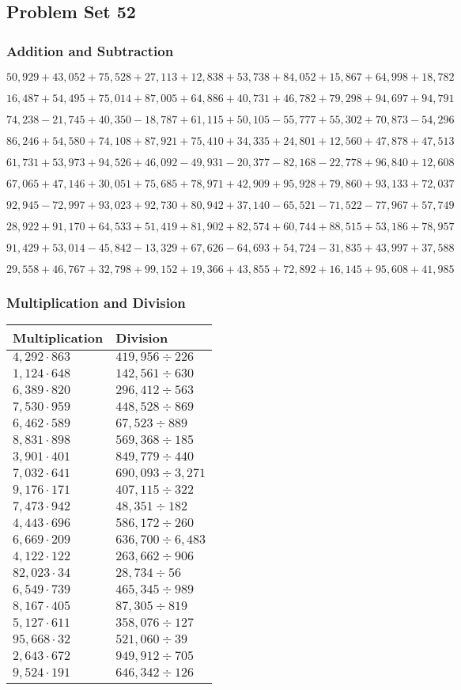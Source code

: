 \hypertarget{problem-set-52-3}{%
\subsection{Problem Set 52}\label{problem-set-52-3}}

\hypertarget{addition-and-subtraction-274}{%
\subsubsection{Addition and
Subtraction}\label{addition-and-subtraction-274}}

\(50,929+43,052+75,528+27,113+12,838+53,738+84,052+15,867+64,998+ 18,782\)

\(16,487+54,495+75,014+87,005+64,886+40,731+46,782+79,298+94,697+94,791\)

\(74,238-21,745+40,350-18,787+61,115+50,105-55,777+55,302+70,873-54,296\)

\(86,246+54,580+74,108+87,921+75,410+34,335+24,801+12,560+47,878+47,513\)

\(61,731+53,973+94,526+46,092-49,931-20,377-82,168-22,778+96,840+12,608\)

\(67,065+47,146+30,051+75,685+78,971+42,909+95,928+79,860+93,133+72,037\)

\(92,945-72,997+93,023+92,730+80,942+37,140-65,521-71,522-77,967+57,749\)

\(28,922+91,170+64,533+51,419+81,902+82,574+60,744+88,515+53,186+78,957\)

\(91,429+53,014-45,842-13,329+67,626-64,693+54,724-31,835+43,997+37,588\)

\(29,558+46,767+32,798+99,152+19,366+43,855+72,892+16,145+95,608+41,985\)

\hypertarget{multiplication-and-division-273}{%
\subsubsection{Multiplication and
Division}\label{multiplication-and-division-273}}

\begin{longtable}[]{@{}ll@{}}
\toprule
Multiplication & Division\tabularnewline
\midrule
\endhead
\(4,292\cdot863\) & \(419,956÷226\)\tabularnewline
\(1,124\cdot648\) & \(142,561÷630\)\tabularnewline
\(6,389\cdot820\) & \(296,412÷563\)\tabularnewline
\(7,530\cdot959\) & \(448,528÷869\)\tabularnewline
\(6,462\cdot589\) & \(67,523÷889\)\tabularnewline
\(8,831\cdot898\) & \(569,368÷185\)\tabularnewline
\(3,901\cdot401\) & \(849,779÷440\)\tabularnewline
\(7,032\cdot641\) & \(690,093÷3,271\)\tabularnewline
\(9,176\cdot171\) & \(407,115÷322\)\tabularnewline
\(7,473\cdot942\) & \(48,351÷182\)\tabularnewline
\(4,443\cdot696\) & \(586,172÷260\)\tabularnewline
\(6,669\cdot209\) & \(636,700÷6,483\)\tabularnewline
\(4,122\cdot122\) & \(263,662÷906\)\tabularnewline
\(82,023\cdot34\) & \(28,734÷56\)\tabularnewline
\(6,549\cdot739\) & \(465,345÷989\)\tabularnewline
\(8,167\cdot405\) & \(87,305÷819\)\tabularnewline
\(5,127\cdot611\) & \(358,076÷127\)\tabularnewline
\(95,668\cdot32\) & \(521,060÷39\)\tabularnewline
\(2,643\cdot672\) & \(949,912÷705\)\tabularnewline
\(9,524\cdot191\) & \(646,342÷126\)\tabularnewline
\bottomrule
\end{longtable}

